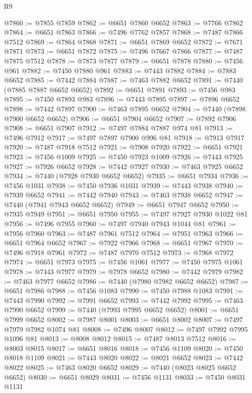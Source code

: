 \begin{lexlean}{R9}
\begin{coremodule}
{{{{{{{{{{{{{{{{{{{{{{{{{{{{{{{{{{{{{{{{{{{{{{{{{{{{{{{{{{{{{{{{{{{{{{{{{{{{{{{{{{{{@7860 := @7855 @7859
@7862 := @6651 @7860 @6652
@7863 := @7766 @7862
@7864 := @6651 @7863
@7866 := @7496 @7762 @7857
@7868 := @7487 @7866 @7512
@7869 := @7864 @7868
@7871 := @6651 @7869 @6652
@7872 := @7671 @7871
@7873 := @6651 @7872
@7875 := @7496 @7667 @7866
@7877 := @7487 @7875 @7512
@7878 := @7873 @7877
@7879 := @6651 @7878
@7880 := @7456 @961
@7882 := @7450 @7880 @961
@7883 := @7443 @7882
@7884 := @7883 @6652
@7885 := @7442 @7884
@7887 := @7463 @7882 @6652
@7891 := @7440 (@7885 @7887 @6652 @6652)
@7892 := @6651 @7891
@7893 := @7456 @983
@7895 := @7450 @7893 @983
@7896 := @7443 @7895
@7897 := @7896 @6652
@7898 := @7442 @7897
@7900 := @7463 @7895 @6652
@7904 := @7440 (@7898 @7900 @6652 @6652)
@7906 := @6651 @7904 @6652
@7907 := @7892 @7906
@7908 := @6651 @7907
@7912 := @7497 @7884 @7887 @974 @81
@7913 := @7496 @7912
@7917 := @7497 @7897 @7900 @996 @81
@7918 := @7913 @7917
@7920 := @7487 @7918 @7512
@7921 := @7908 @7920
@7922 := @6651 @7921
@7923 := @7456 @1009
@7925 := @7450 @7923 @1009
@7926 := @7443 @7925
@7927 := @7926 @6652
@7928 := @7442 @7927
@7930 := @7463 @7925 @6652
@7934 := @7440 (@7928 @7930 @6652 @6652)
@7935 := @6651 @7934
@7936 := @7456 @1031
@7938 := @7450 @7936 @1031
@7939 := @7443 @7938
@7940 := @7939 @6652
@7941 := @7442 @7940
@7943 := @7463 @7938 @6652
@7947 := @7440 (@7941 @7943 @6652 @6652)
@7949 := @6651 @7947 @6652
@7950 := @7935 @7949
@7951 := @6651 @7950
@7955 := @7497 @7927 @7930 @1022 @81
@7956 := @7496 @7955
@7960 := @7497 @7940 @7943 @1044 @81
@7961 := @7956 @7960
@7963 := @7487 @7961 @7512
@7964 := @7951 @7963
@7966 := @6651 @7964 @6652
@7967 := @7922 @7966
@7968 := @6651 @7967
@7970 := @7496 @7918 @7961
@7972 := @7487 @7970 @7512
@7973 := @7968 @7972
@7974 := @6651 @7973
@7975 := @7456 @1061
@7977 := @7450 @7975 @1061
@7978 := @7443 @7977
@7979 := @7978 @6652
@7980 := @7442 @7979
@7982 := @7463 @7977 @6652
@7986 := @7440 (@7980 @7982 @6652 @6652)
@7987 := @6651 @7986
@7988 := @7456 @1083
@7990 := @7450 @7988 @1083
@7991 := @7443 @7990
@7992 := @7991 @6652
@7993 := @7442 @7992
@7995 := @7463 @7990 @6652
@7999 := @7440 (@7993 @7995 @6652 @6652)
@8001 := @6651 @7999 @6652
@8002 := @7987 @8001
@8003 := @6651 @8002
@8007 := @7497 @7979 @7982 @1074 @81
@8008 := @7496 @8007
@8012 := @7497 @7992 @7995 @1096 @81
@8013 := @8008 @8012
@8015 := @7487 @8013 @7512
@8016 := @8003 @8015
@8017 := @6651 @8016
@8018 := @7456 @1109
@8020 := @7450 @8018 @1109
@8021 := @7443 @8020
@8022 := @8021 @6652
@8023 := @7442 @8022
@8025 := @7463 @8020 @6652
@8029 := @7440 (@8023 @8025 @6652 @6652)
@8030 := @6651 @8029
@8031 := @7456 @1131
@8033 := @7450 @8031 @1131
}}}}}}}}}}}}}}}}}}}}}}}}}}}}}}}}}}}}}}}}}}}}}}}}}}}}}}}}}}}}}}}}}}}}}}}}}}}}}}}}}}}}
\end{coremodule}
\end{lexlean}
